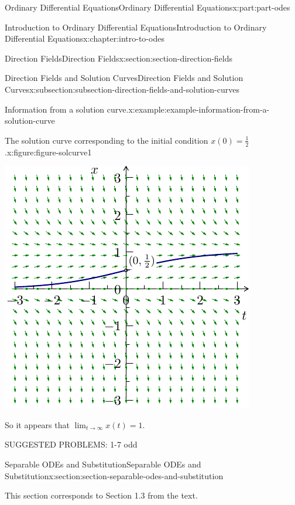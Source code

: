 \documentclass[twoside,10pt,]{book}
\numberwithin{equation}{part}
\begin{document}
\begin{partptx}{Ordinary Differential Equations}{}{Ordinary Differential Equations}{}{}{x:part:part-odes}
\begin{chapterptx}{Introduction to Ordinary Differential Equations}{}{Introduction to Ordinary Differential Equations}{}{}{x:chapter:intro-to-odes}
\begin{sectionptx}{Direction Fields}{}{Direction Fields}{}{}{x:section:section-direction-fields}
\begin{subsectionptx}{Direction Fields and Solution Curves}{}{Direction Fields and Solution Curves}{}{}{x:subsection:subsection-direction-fields-and-solution-curves}
\begin{example}{Information from a solution curve.}{x:example:example-information-from-a-solution-curve}
\begin{figureptx}{The solution curve corresponding to the initial condition \(x(0) = \frac{1}{2}\).}{x:figure:figure-solcurve1}{}
\begin{image}{0.25}{0.5}{0.25}
\includegraphics[width=\linewidth]{generated/asymptote/image-5.pdf}
\end{image}%
\tcblower
\end{figureptx}%
So it appears that \(\lim_{t\to\infty}x(t) = 1\).%
\end{example}
\end{subsectionptx}
\begin{conclusion}{}%
SUGGESTED PROBLEMS: 1-7 odd%
\end{conclusion}%
\end{sectionptx}
%
%
\typeout{************************************************}
\typeout{************************************************}
%
\begin{sectionptx}{Separable ODEs and Substitution}{}{Separable ODEs and Substitution}{}{}{x:section:section-separable-odes-and-substitution}
\begin{introduction}{}%
This section corresponds to Section 1.3 from the text.%
\end{introduction}%
%
%
\typeout{************************************************}
\typeout{************************************************}
%

\end{sectionptx}
\end{chapterptx}
\end{partptx}
\end{document}
